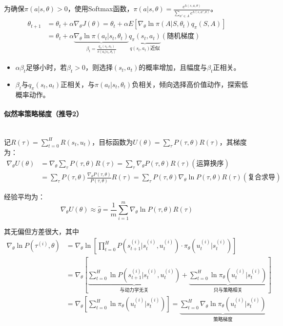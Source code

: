 \documentclass[
12pt, %
a4paper, 
oneside, %
headinclude,footinclude, %
]{scrartcl}
\begin{document}
为确保$ \pi(a|s, \theta) > 0 $，使用Softmax函数，$ \pi(a|s, \theta) = \frac{e^{h(s, a, \theta)}}{\sum_{a' \in A} e^{h(s, a', \theta)}} $。
\begin{align*}
\theta_{t + 1} &= \theta_t + \alpha\nabla_\theta J(\theta) = \theta_t + \alpha E[\nabla_\theta \ln \pi(A|S, \theta_t) q_\pi(S, A)] \\
&= \theta_t + \alpha \underbrace{\nabla_\theta \ln \pi(a_t|s_t, \theta_t)}_{\beta_t = \frac{q_\pi(s_t, a_t)}{\pi(a_t|s_t, \theta_t)}} \underbrace{q_\pi(s_t, a_t)}_{q(s_t, a_t)\text{近似}} (\text{随机梯度})
\end{align*}    

\begin{itemize}
\item $ \alpha\beta_t $足够小时，若$ \beta_t > 0 $，则选择$ (s_t, a_t) $的概率增加，且幅度与$ \beta_t $正相关。
\item $ \beta_t $与$ q_{\pi}(s_t, a_t) $正相关，与$ \pi(a_t|s_t, \theta_t) $负相关，倾向选择高价值动作，探索低概率动作。
\end{itemize}
\paragraph{似然率策略梯度（推导2）}~\\

记$ R(\tau) = \sum_{t = 0}^H R(s_t, u_t) $，目标函数为$ U(\theta) = \sum_{\tau} P(\tau, \theta) R(\tau) $，其梯度为：
\begin{align*}
\nabla_\theta U(\theta) &= \nabla_\theta \sum_{\tau} P(\tau, \theta) R(\tau) = \sum_{\tau} \nabla_\theta P(\tau, \theta) R(\tau) (\text{运算换序}) \\
&= \sum_{\tau} P(\tau, \theta) \frac{\nabla_\theta P(\tau, \theta)}{P(\tau, \theta)} R(\tau) = \sum_{\tau} P(\tau, \theta) \nabla_\theta \ln P(\tau, \theta) R(\tau) (\text{复合求导})
\end{align*}

经验平均为：
$$ \nabla_\theta U(\theta) \approx \hat{g} = \frac{1}{m} \sum_{i = 1}^m \nabla_\theta \ln P(\tau, \theta) R(\tau) $$

其无偏但方差很大，其中
\begin{align*}
\nabla_\theta\ln P(\tau^{(i)}, \theta) &= \nabla_\theta\ln[\prod_{t = 0}^{H} P(s_{t + 1}^{(i)}|s_t^{(i)}, u_t^{(i)}) \cdot \pi_\theta(u_t^{(i)}|s_t^{(i)})] \\
&= \nabla_\theta[\underbrace{\sum_{t = 0}^{H} \ln P(s_{t + 1}^{(i)}|s_t^{(i)}, u_t^{(i)})}_{\text{与动力学无关}} + \underbrace{\sum_{t = 0}^{H} \ln \pi_\theta(u_t^{(i)}|s_t^{(i)})}_{\text{只与策略相关}}] \\
&= \nabla_\theta[\sum_{t = 0}^{H} \ln \pi_\theta(u_t^{(i)}|s_t^{(i)})] = \underbrace{\sum_{t = 0}^{H} \nabla_\theta \ln \pi_\theta(u_t^{(i)}|s_t^{(i)})}_{\text{策略梯度}} 
\end{align*}
\end{document}
